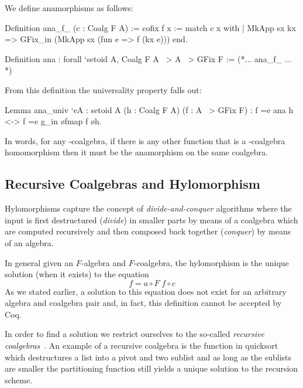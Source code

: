 \documentclass[ a4paper, UKenglish, cleveref, autoref, thm-restate]{lipics-v2021}
\begin{document}
We define anamorphisms as follows:
\begin{coqcode}
Definition ana_f_ (c : Coalg F A) :=
  cofix f x := 
    match c x with | MkApp sx kx => GFix_in (MkApp sx (fun e => f (kx e))) end.

Definition ana : forall `{setoid A}, Coalg F A ~> A ~> GFix F := (*... ana_f_ ... *)
\end{coqcode}
From this definition the universality property falls out:
\begin{coqcode}
Lemma ana_univ `{eA : setoid A} (h : Coalg F A) (f : A ~> GFix F)
: f =e ana h <-> f =e g_in \o fmap f \o h.
\end{coqcode}
In words, for any -coalgebra, if there is any other function 
that is a -coalgebra homomorphism then it must be the anamorphism on the
same coalgebra.

\subsection{Recursive Coalgebras and Hylomorphism}
\label{sec:rec-coalgebras}
Hylomorphisms capture the concept of \emph{divide-and-conquer} algorithms where
the input is first destructured (\emph{divide}) in smaller parts by means of a
coalgebra which are computed recursively and then composed back together
(\emph{conquer}) by means of an algebra.

In general given an $F$-algebra and $F$-coalgebra, the hylomorphism is the
unique solution (when it exists) to the equation
\begin{equation}
  \label{eq:hylo}
  f = a \circ F\; f \circ c
\end{equation}
As we stated earlier, a solution to this equation does not exist for an arbitrary  algebra and coalgebra pair and, in fact, this definition cannot be accepted by Coq.

In order to find a solution we restrict ourselves to the so-called
\emph{recursive coalgebras}~\cite{AdamekMM19,CaprettaUV04}.  An example of a
recursive coalgebra is the  function in quicksort which
destructures a list into a pivot and two sublist and as long as the sublists are
smaller the partitioning function still yields a unique solution to the
recursion scheme.
\end{document}
